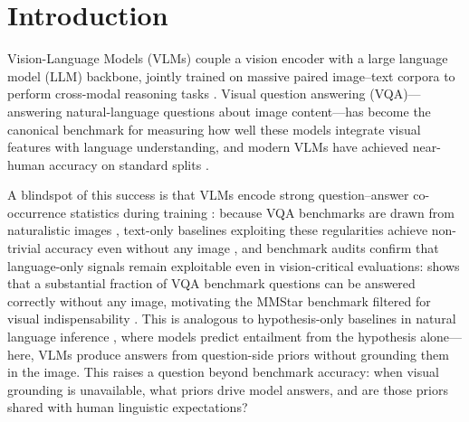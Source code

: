 \section{Introduction}

Vision-Language Models (VLMs) couple a vision encoder with a large language
model (LLM) backbone, jointly trained on massive paired image--text corpora to
perform cross-modal reasoning tasks \citep{liu2023visual,zhang2023multimodal}.
Visual question answering (VQA)---answering natural-language questions about
image content---has become the canonical benchmark for measuring how well these
models integrate visual features with language understanding, and modern VLMs have achieved near-human accuracy on standard splits \citep{antol2015vqa,goyal2016making}.

A blindspot of this success is that VLMs encode strong question--answer
co-occurrence statistics during training \citep{mccoy2024embers}: because VQA
benchmarks are drawn from naturalistic images \citep{torralba2011unbiased},
text-only baselines exploiting these regularities achieve non-trivial
accuracy even without any image \citep{jabri2016revisiting,zhang2016yin,agrawal2018dont},
and benchmark audits confirm that language-only signals remain exploitable
even in vision-critical evaluations: \citet{chen2024are} shows that a substantial
fraction of VQA benchmark questions can be answered correctly
without any image, motivating the MMStar benchmark filtered for visual
indispensability \citep{chen2024are,lee2024vlind}.
This is analogous to hypothesis-only baselines in natural language inference
\citep{poliak2018hypothesis}, where models predict entailment from the
hypothesis alone---here, VLMs produce answers from question-side priors without grounding them in the image.
This raises a question beyond benchmark accuracy: when visual grounding is
unavailable, what priors drive model answers, and are those priors shared
with human linguistic expectations?
